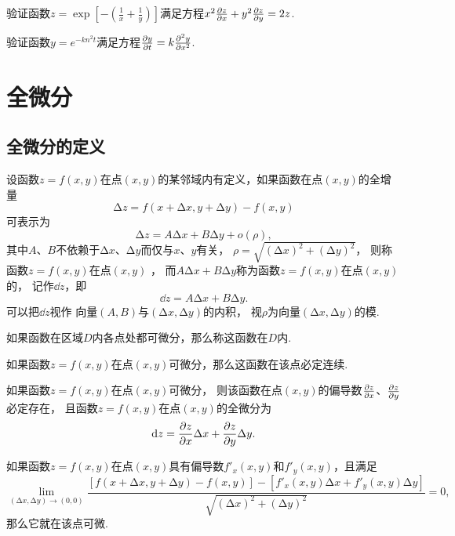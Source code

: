 \begin{example}
验证函数\(z = \exp[-\left(\frac{1}{x}+\frac{1}{y}\right)]\)满足方程\(x^2 \pdv{z}{x} + y^2 \pdv{z}{y} = 2z\).
\end{example}

\begin{example}
验证函数\(y = e^{-k n^2 t}\)满足方程\(\pdv{y}{t} = k \pdv[2]{y}{x}\).
\end{example}

\section{全微分}
\subsection{全微分的定义}
\begin{definition}
设函数\(z=f(x,y)\)在点\((x,y)\)的某邻域内有定义，如果函数在点\((x,y)\)的全增量\[
\increment z = f(x+\increment x,y+\increment y)-f(x,y)
\]可表示为\[
\increment z = A \increment x + B \increment y + o(\rho),
\]其中\(A\)、\(B\)不依赖于\(\increment x\)、\(\increment y\)而仅与\(x\)、\(y\)有关，
\(\rho=\sqrt{(\increment x)^2+(\increment y)^2}\)，
则称函数\(z=f(x,y)\)在点\((x,y)\) ，
而\(A \increment x + B \increment y\)称为函数\(z=f(x,y)\)在点\((x,y)\)的，
记作\(\dd{z}\)，即\[
\dd{z} = A \increment x + B \increment y.
\]可以把\(\dd{z}\)视作%
向量\((A,B)\)与\((\increment x,\increment y)\)的内积，
视\(\rho\)为向量\((\increment x,\increment y)\)的模.

如果函数在区域\(D\)内各点处都可微分，那么称这函数在\(D\)内.
\end{definition}

\begin{theorem}
如果函数\(z=f(x,y)\)在点\((x,y)\)可微分，那么这函数在该点必定连续.
\end{theorem}

\begin{theorem}[必要条件]\label{theorem:多元函数微分法.二元函数可微的必要条件}
如果函数\(z=f(x,y)\)在点\((x,y)\)可微分，
则该函数在点\((x,y)\)的偏导数\(\pdv{z}{x}\)、\(\pdv{z}{y}\)必定存在，
且函数\(z=f(x,y)\)在点\((x,y)\)的全微分为\[
\dd{z} = \pdv{z}{x} \Delta x + \pdv{z}{y} \Delta y.
\]
\end{theorem}

\begin{corollary}
如果函数\(z=f(x,y)\)在点\((x,y)\)具有偏导数\(f'_x(x,y)\)和\(f'_y(x,y)\)，且满足\[
\lim\limits_{(\increment x,\increment y)\to(0,0)}
 \frac{[f(x+\increment x,y+\increment y)-f(x,y)]-[f'_x(x,y) \increment x + f'_y(x,y) \increment y]}{\sqrt{(\increment x)^2+(\increment y)^2}} = 0,
\]那么它就在该点可微.
\end{corollary}

